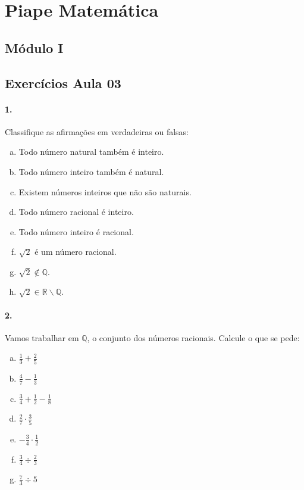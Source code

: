 \documentclass[a4paper,twocolumn,12pt]{article}
\begin{document}
 
\section*{Piape Matemática} 
 
\subsection*{Módulo I}\label{muxf3dulo-i}
 
\subsection*{Exercícios Aula 03}\label{exercuxedcios-aula-03}

\paragraph{1.} Classifique as afirmações em verdadeiras ou falsas:
\begin{enumerate}[a)]
\item Todo número natural também é inteiro. 
\item Todo número inteiro também é natural.  
\item Existem números inteiros que não são naturais.
\item Todo número racional é inteiro. 
\item Todo número inteiro é racional.
\item $\sqrt{2}$ é um número racional.
\item $\sqrt{2} \notin \mathbb{Q}$.
\item $\sqrt{2} \in \mathbb{R\backslash Q}$.
\end{enumerate}

\paragraph*{2. } Vamos trabalhar em $\mathbb{Q}$, o conjunto dos números racionais. Calcule o que se pede:

\begin{enumerate}[a)]
  \item $\displaystyle\frac{1}{3} + \frac{2}{5}$
  \item $\displaystyle\frac{4}{7} - \frac{1}{3}$
  \item $\displaystyle\frac{3}{4} + \frac{1}{2} - \frac{1}{8}$
  \item $\displaystyle\frac{2}{7}\cdot \frac{3}{5}$
  \item $\displaystyle-\frac{3}{4} \cdot \frac{1}{2}$
  \item $\displaystyle\frac{3}{4} \div \frac{2}{3}$
  \item $\displaystyle \frac{7}{3} \div 5$
\end{enumerate}
\end{document}

